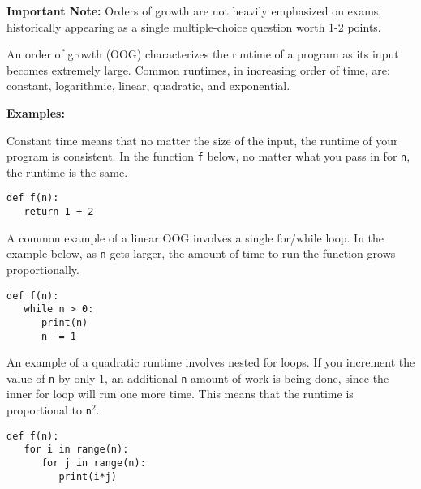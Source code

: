 \begin{blocksection}
\textbf{Important Note:} Orders of growth are not heavily emphasized on exams, historically appearing as a single multiple-choice question worth 1-2 points.

An order of growth (OOG) characterizes the runtime of a program as its input becomes extremely large. Common runtimes, in increasing order of time, are: constant, logarithmic, linear, quadratic, and exponential.

\textbf{Examples:}

Constant time means that no matter the size of the input, the runtime of your program is consistent. In the function \lstinline{f} below, no matter what you pass in for \lstinline{n}, the runtime is the same. \\
\vspace{1.5mm}
\begin{lstlisting}
def f(n):
   return 1 + 2
\end{lstlisting}
A common example of a linear OOG involves a single for/while loop. In the example below, as \lstinline{n} gets larger, the amount of time to run the function grows proportionally. \\
\begin{lstlisting}
def f(n):
   while n > 0:
      print(n)
      n -= 1
\end{lstlisting}
An example of a quadratic runtime involves nested for loops. If you increment the value of \lstinline{n} by only 1, an additional \lstinline{n} amount of work is being done, since the inner for loop will run one more time. This means that the runtime is proportional to \lstinline{n}$^{2}$. \\
\vspace{1.5mm}
\begin{lstlisting}
def f(n):
   for i in range(n):
      for j in range(n):
         print(i*j)
\end{lstlisting}

\end{blocksection}